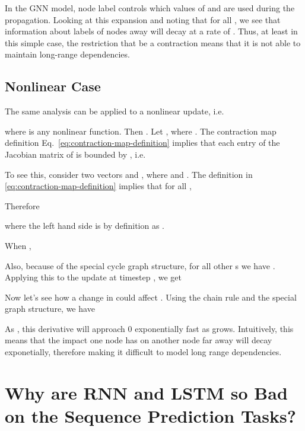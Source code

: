 \documentclass{article} \usepackage{iclr2016_conference,times}
\begin{document}
In the GNN model, node label  controls which values of 
and  are used during the propagation. Looking at this expansion
and noting that  for all , we see that information about
labels of nodes  away will decay at a rate of
.
Thus, at least in this simple case, the restriction that  be
a contraction means that it is not able to maintain long-range
dependencies.

\subsection{Nonlinear Case}

The same analysis can be applied to a nonlinear update, i.e.

where  is any nonlinear function. Then . Let , where . The contraction map
definition Eq.~\ref{eq:contraction-map-definition} implies that each entry of
the Jacobian matrix of  is bounded by , i.e.

To see this, consider two vectors  and , where  and . The definition in
\eqref{eq:contraction-map-definition} implies that for all ,

Therefore

where the left hand side is  by definition as
.

When , 

Also, because of the special cycle graph structure, for all other s we have
.  Applying this to the update at timestep , we get


Now let's see how a change in  could affect .  Using
the chain rule and the special graph structure, we have

As , this derivative will approach 0 exponentially fast as 
grows. Intuitively, this means that the impact one node has on another node
far away will decay exponetially, therefore making it difficult to model long
range dependencies.



\section{Why are RNN and LSTM so Bad on the Sequence Prediction Tasks?}
\end{document}
